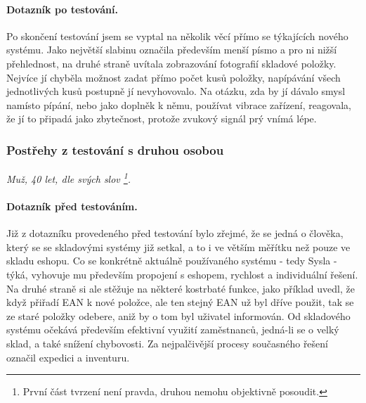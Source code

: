 \paragraph{Dotazník po testování.} Po skončení testování jsem se vyptal na několik věcí přímo se týkajících nového systému. Jako největší slabinu označila především menší písmo a pro ni nižší přehlednost, na druhé straně uvítala zobrazování fotografií skladové položky. Nejvíce jí chyběla možnost zadat přímo počet kusů položky, napípávání všech jednotlivých kusů postupně jí nevyhovovalo. Na otázku, zda by jí dávalo smysl namísto pípání, nebo jako doplněk k němu, používat vibrace zařízení, reagovala, že jí to připadá jako zbytečnost, protože zvukový signál prý vnímá lépe.


\subsubsection{Postřehy z testování s druhou osobou}
\emph{Muž, 40 let, dle svých slov \footnote{První část tvrzení není pravda, druhou nemohu objektivně posoudit.}.}

\paragraph{Dotazník před testováním.} Již z dotazníku provedeného před testování bylo zřejmé, že se jedná o člověka, který se se skladovými systémy již setkal, a to i ve větším měřítku než pouze ve skladu eshopu. Co se konkrétně aktuálně používaného systému - tedy Sysla - týká, vyhovuje mu především propojení s eshopem, rychlost a individuální řešení. Na druhé straně si ale stěžuje na některé kostrbaté funkce, jako příklad uvedl, že když přiřadí EAN k nové položce, ale ten stejný EAN už byl dříve použit, tak se ze staré položky odebere, aniž by o tom byl uživatel informován. Od skladového systému očekává především efektivní využití zaměstnanců, jedná-li se o velký sklad, a také snížení chybovosti. Za nejpalčivější procesy současného řešení označil expedici a inventuru.

